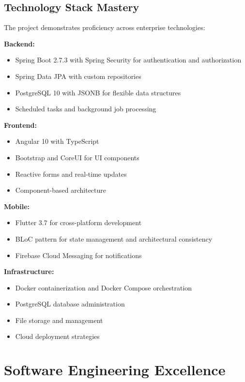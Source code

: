 \subsection*{Technology Stack Mastery}

The project demonstrates proficiency across enterprise technologies:

\textbf{Backend:}
\begin{itemize}
\item Spring Boot 2.7.3 with Spring Security for authentication and authorization
\item Spring Data JPA with custom repositories
\item PostgreSQL 10 with JSONB for flexible data structures
\item Scheduled tasks and background job processing
\end{itemize}

\textbf{Frontend:}
\begin{itemize}
\item Angular 10 with TypeScript
\item Bootstrap and CoreUI for UI components
\item Reactive forms and real-time updates
\item Component-based architecture
\end{itemize}

\textbf{Mobile:}
\begin{itemize}
\item Flutter 3.7 for cross-platform development
\item BLoC pattern for state management and architectural consistency
\item Firebase Cloud Messaging for notifications
\end{itemize}

\textbf{Infrastructure:}
\begin{itemize}
\item Docker containerization and Docker Compose orchestration
\item PostgreSQL database administration
\item File storage and management
\item Cloud deployment strategies
\end{itemize}

\section*{Software Engineering Excellence}

